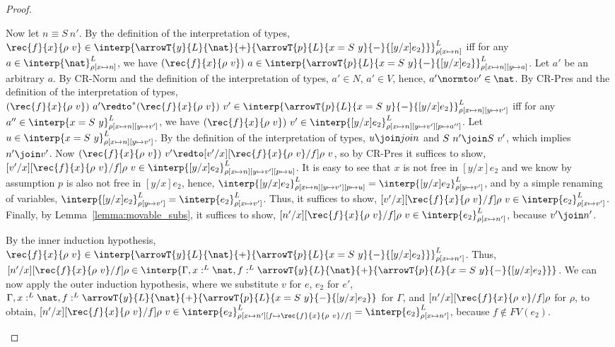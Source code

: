\begin{proof}
\begin{itemize}
  \noindent
  Now let $n \equiv S\ n'$.  By the definition of the interpretation
  of types, $\rec{f}{x}{\rho\ v} \in
  \interp{\arrowT{y}{L}{\nat}{+}{\arrowT{p}{L}{x =
  S\ y}{-}{[y/x]e_2}}}^L_{\rho[x \mapsto n]}$ iff for any $a
  \in \interp{\nat}^L_{\rho[x \mapsto n]}$, we have
  $(\rec{f}{x}{\rho\ v})\ a \in \interp{\arrowT{p}{L}{x =
  S\ y}{-}{[y/x]e_2}}^L_{\rho[x \mapsto n][y \mapsto a]}$.  Let
  $a'$ be an arbitrary $a$. By CR-Norm and the definition of the
  interpretation of types, $a' \in N$, $a' \in V$, hence, $a' \normto
  v' \in \nat$.  By CR-Pres and the definition of the interpretation of
  types, $(\rec{f}{x}{\rho\ v})\ a' \redto^*
  (\rec{f}{x}{\rho\ v})\ v' \in \interp{\arrowT{p}{L}{x =
  S\ y}{-}{[y/x]e_2}}^L_{\rho[x \mapsto n][y \mapsto v']}$ iff
  for any $a'' \in \interp{x = S\ y}^L_{\rho[x \mapsto n][y \mapsto
  v']}$, we have $(\rec{f}{x}{\rho\ v})\ v' \in
  \interp{[y/x]e_2}^L_{\rho[x \mapsto n][y \mapsto v'][p \mapsto 
  a'']}$.  Let 
  $u \in \interp{x = S\ y}^L_{\rho[x \mapsto n][y \mapsto v']}$.  By the definition of the
  interpretation of types, $u \join join$ and $S\ n' \join S\ v'$,
  which implies $n' \join v'$.  Now $(\rec{f}{x}{\rho\ v})\ v'
  \redto [v'/x][\rec{f}{x}{\rho\ v}/f]\rho\ v$, so by CR-Pres it
  suffices to show, $[v'/x][\rec{f}{x}{\rho\ v}/f]\rho\ v \in
  \interp{[y/x]e_2}^L_{\rho[x \mapsto n][y \mapsto v'][p \mapsto
  u]}$.  It is easy to see that $x$ is not free in $[y/x]e_2$ and
  we know by assumption $p$ is also not free in $[y/x]e_2$, hence, 
  $\interp{[y/x]e_2}^L_{\rho[x \mapsto n][y \mapsto v'][p \mapsto u]} = 
  \interp{[y/x]e_2}^L_{\rho[y \mapsto v']}$, and by a simple renaming of variables,
  $\interp{[y/x]e_2}^L_{\rho[y \mapsto v']} =
  \interp{e_2}^L_{\rho[x \mapsto v']}$.  Thus, it suffices to show,
  $[v'/x][\rec{f}{x}{\rho\ v}/f]\rho\ v \in
  \interp{e_2}^L_{\rho[x \mapsto v']}$.  Finally, by 
  Lemma~\ref{lemma:movable_subs},
  it suffices to show, $[n'/x][\rec{f}{x}{\rho\ v}/f]\rho\ v \in
  \interp{e_2}^L_{\rho[x \mapsto n']}$, because $v' \join n'$.

  \noindent
  By the inner induction hypothesis, $\rec{f}{x}{\rho\ v} \in
  \interp{\arrowT{y}{L}{\nat}{+}{\arrowT{p}{L}{x =
  S\ y}{-}{[y/x]e_2}}}^L_{\rho[x \mapsto n']}$.
  Thus, $[n'/x][\rec{f}{x}{\rho\ v}/f]\rho \in
  \interp{\Gamma,x:^L \nat, f:^L
  \arrowT{y}{L}{\nat}{+}{\arrowT{p}{L}{x = S\ y}{-}{[y/x]e_2}}}$.
  We can now apply the outer induction hypothesis, where we substitute
  $v$ for $e$, $e_2$ for $e'$, $\Gamma,x:^L \nat,f:^L
  \arrowT{y}{L}{\nat}{+}{\arrowT{p}{L}{x = S\ y}{-}{[y/x]e_2}}$ for
  $\Gamma$, and $[n'/x][\rec{f}{x}{\rho\ v}/f]\rho$ for $\rho$,
  to obtain, $[n'/x][\rec{f}{x}{\rho\ v}/f]\rho\ v \in
  \interp{e_2}^L_{\rho[x \mapsto n'][f \mapsto
  \rec{f}{x}{\rho\ v}/f]} = \interp{e_2}^L_{\rho[x \mapsto
  n']}$, because $f \not \in FV(e_2)$.


\end{itemize}
\end{proof}
